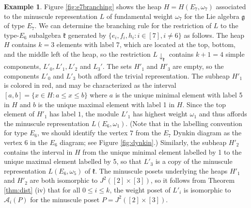 \documentclass[11pt]{amsart}
\theoremstyle{plain}
\theoremstyle{definition}
\newtheorem{example}[theorem]{Example}
\theoremstyle{remark}
\numberwithin{equation}{section}
\newcommand{\fg}{{\mathfrak g}}
\newcommand{\fk}{{\mathfrak k}}
\begin{document}
\begin{example}
\label{eg:e7branching}
Figure \ref{fig:e7branching} shows the heap $H=H(E_7,\omega_7)$ associated to
the minuscule representation $L$ of fundamental weight $\omega_7$ for the Lie
algebra $\fg$ of type $E_7$. We can determine the branching rule for the
restriction of $L$ to the type-$E_6$ subalgebra $\fk$ generated by
$\{e_i,f_i,h_i: i\in [7], i\neq 6\}$ as follows. The heap $H$ contains $k=3$
elements with label $7$, which are located at the top, bottom, and the middle
left of the heap, so the restriction $L\!\downarrow_\fk$ contains $k+1=4$
simple components, $L'_0,L'_1,L'_2$ and $L_3'$. The sets $H'_1$ and $H'_3$ are
empty, so the components $L'_0$ and $L'_3$ both afford the trivial
representation.  The subheap $H'_1$ is colored in red, and may be characterized
as the interval $[a,b]=\{x\in H: a\le x\le b\}$ where $a$ is the unique minimal
element with label 5 in $H$ and $b$ is the unique maximal element with label 1 in $H$.
Since the top element of $H'_1$ has label $1$, the module $L'_1$ has highest
weight $\omega_1$ and thus affords the minuscule representation
$L(E_6,\omega_1)$. (Note that in the labelling convention for type
$E_6$, we should identify the vertex $7$ from the $E_7$ Dynkin diagram as the
vertex $6$ in the $E_6$ diagram; see Figure \ref{fig:dynkin}.) Similarly, the
subheap $H'_2$ contains the interval in $H$ from the unique minimal element
labelled by 1 to the unique maximal element labelled by 5, so that $L'_3$ is a
copy of the minuscule representation $L(E_6,\omega_5)$ of $\fk$.  The minuscule
posets underlying the heaps $H'_1$ and $H'_2$ are both isomorphic to
$J^2([2]\times[3])$, so it follows from Theorem \ref{thm:dist} (iv) that for all
$0\le i\le k$, the weight poset of $L'_i$ is isomorphic to $\mathcal{A}_i(P)$
for the minuscule poset $P=J^2([2]\times [3])$.

\begin{figure}[h!]
\centering
{}
\end{figure}
\end{example}
\end{document}
